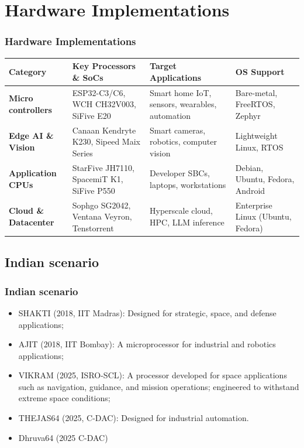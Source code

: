 \documentclass{beamer}
\begin{document}
\section{Hardware Implementations}
\begin{frame}[plain]
\frametitle{Hardware Implementations}
\scriptsize{
    \begin{tabularx}{\textwidth}{L{2.2cm} L{2cm} L{3.2cm} L{2.2cm}}
        \toprule
        \textbf{Category} & \textbf{Key Processors \& SoCs} & \textbf{Target Applications} & \textbf{OS Support} \\
        \midrule
        \textbf{Micro controllers} & ESP32-C3/C6, WCH CH32V003, SiFive E20 & Smart home IoT, sensors, wearables, automation & Bare-metal, FreeRTOS, Zephyr \\
        \textbf{Edge AI \& Vision} & Canaan Kendryte K230, Sipeed Maix Series & Smart cameras, robotics, computer vision & Lightweight Linux, RTOS \\
        \textbf{Application CPUs} & StarFive JH7110, SpacemiT K1, SiFive P550 & Developer SBCs, laptops, workstations & Debian, Ubuntu, Fedora, Android \\
        \textbf{Cloud \& Datacenter} & Sophgo SG2042, Ventana Veyron, Tenstorrent & Hyperscale cloud, HPC, LLM inference & Enterprise Linux (Ubuntu, Fedora) \\
        \bottomrule
    \end{tabularx}}
\end{frame}
\subsection{Indian scenario}
\begin{frame}
\frametitle{Indian scenario}
 \begin{itemize}
  \item SHAKTI (2018, IIT Madras): Designed for strategic, space, and defense applications;
 \item AJIT (2018, IIT Bombay): A microprocessor for industrial and robotics applications;
 \item VIKRAM (2025, ISRO-SCL): A processor developed for space applications such as navigation, guidance, and mission operations; engineered to withstand extreme space conditions;
 \item THEJAS64 (2025, C-DAC): Designed for industrial automation.
  \item Dhruva64 (2025 C-DAC)
 \end{itemize}

\end{frame}
\end{document}
